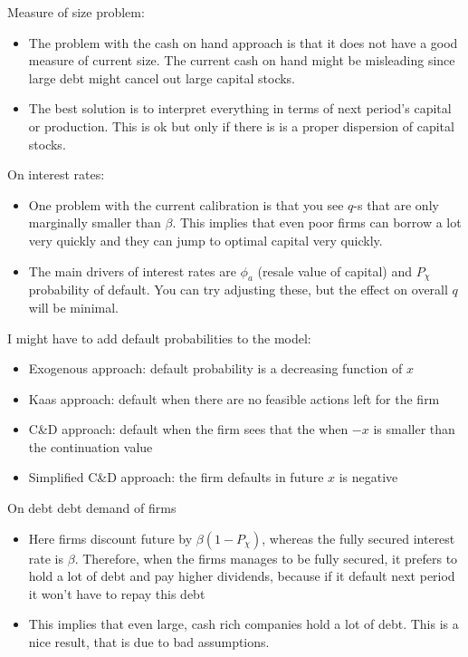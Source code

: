\documentclass[12pt]{article}
\begin{document}
Measure of size problem: 
\begin{itemize}
    \item The problem with the cash on hand approach is that it does not have a good measure of current size. The current cash on hand might be misleading since large debt might cancel out large capital stocks.
    \item The best solution is to interpret everything in terms of next period's capital or production. This is ok but only if there is is a proper dispersion of capital stocks.
\end{itemize} 
On interest rates:
\begin{itemize}
    \item One problem with the current calibration is that you see $q$-s that are only marginally smaller than $\beta$. This implies that even poor firms can borrow a lot very quickly and they can jump to optimal capital very quickly. 
    \item The main drivers of interest rates are $\phi_a$ (resale value of capital) and $P_{\chi}$ probability of default. You can try adjusting these, but the effect on overall $q$ will be minimal. 
\end{itemize}
I might have to add default probabilities to the model:
\begin{itemize}
    \item Exogenous approach: default probability is a decreasing function of $x$
    \item Kaas approach: default when there are no feasible actions left for the firm 
    \item C\&D approach: default when the firm sees that the when $-x$ is smaller than the continuation value
    \item Simplified C\&D approach: the firm defaults in future $x$ is negative
\end{itemize}
On debt debt demand of firms
\begin{itemize}
    \item Here firms discount future by $\beta(1-P_\chi)$, whereas the fully secured interest rate is $\beta$. Therefore, when the firms manages to be fully secured, it prefers to hold a lot of debt and pay higher dividends, because if it default next period it won't have to repay this debt
    \item This implies that even large, cash rich companies hold a lot of debt. This is a nice result, that is due to bad assumptions. 
\end{itemize}
\end{document}
